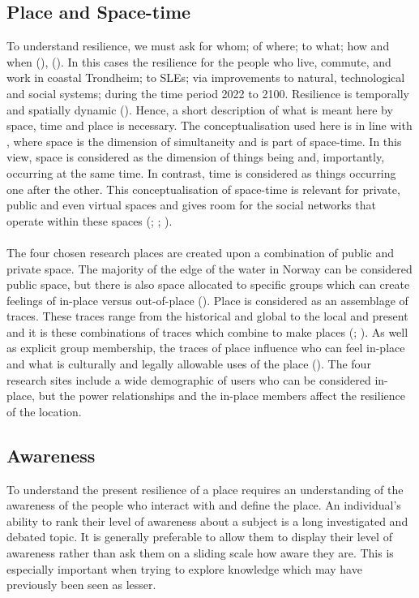\subsection{Place and Space-time} 
To understand resilience, we must ask for whom; of where; to what; how and when (\cite{cutter_community_2020}), (\cite{moser_turbulent_2019}). In this cases the resilience for the people who live, commute, and work in coastal Trondheim; to SLEs; via improvements to natural, technological and social systems; during the time period 2022 to 2100.  Resilience is temporally and spatially dynamic (\cite{cutter_community_2020}). Hence, a short description of what is meant here by space, time and place is necessary. The conceptualisation used here is in line with \cite{massey_for_2005}, where space is the dimension of simultaneity and is part of space-time. In this view, space is considered as the dimension of things being and, importantly, occurring at the same time. In contrast, time is considered as things occurring one after the other. This conceptualisation of space-time is relevant for private, public and even virtual spaces and gives room for the social networks that operate within these spaces (\cite{massey_for_2005}; \cite{allen_rethinking_1998}; \cite{del_casino_social_2009}).

\paragraph{}
The four chosen research places are created upon a combination of public and private space. The majority of the edge of the water in Norway can be considered public space, but there is also space allocated to specific groups which can create feelings of in-place versus out-of-place (\cite{anderson_understanding_2015}). Place is considered as an assemblage of traces. These traces range from the historical and global to the local and present and it is these combinations of traces which combine to make places (\cite{anderson_understanding_2015}; \cite{massey_for_2005}). As well as explicit group membership, the traces of place influence who can feel in-place and what is culturally and legally allowable uses of the place (\cite{anderson_understanding_2015}). The four research sites include a wide demographic of users who can be considered in-place, but the power relationships and the in-place members affect the resilience of the location. 

\subsection{Awareness}
To understand the present resilience of a place requires an understanding of the awareness of the people who interact with and define the place. An individual’s ability to rank their level of awareness about a subject is a long investigated and debated topic. It is generally preferable to allow them to display their level of awareness rather than ask them on a sliding scale how aware they are. This is especially important when trying to explore knowledge which may have previously been seen as lesser.

